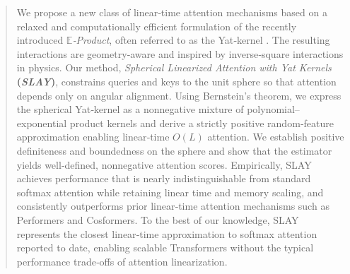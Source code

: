 \documentclass{article}
\begin{document}

\printAffiliationsAndNotice{}

\begin{abstract}
We propose a new class of linear‑time attention mechanisms based on a relaxed and computationally efficient formulation of the recently introduced \emph{$\mathbb{E}$‑Product}, often referred to as the Yat‑kernel \citep{Author2026Concurrent}. The resulting interactions are geometry‑aware and inspired by inverse‑square interactions in physics. 
Our method, \emph{Spherical Linearized Attention with Yat Kernels} \textbf{(\emph{SLAY})}, constrains queries and keys to the unit sphere so that attention depends only on angular alignment. Using Bernstein’s theorem, we express the spherical Yat‑kernel as a nonnegative mixture of polynomial–exponential product kernels and derive a strictly positive random‑feature approximation enabling linear‑time $O(L)$ attention. We establish positive definiteness and boundedness on the sphere and show that the estimator yields well‑defined, nonnegative attention scores.
Empirically, SLAY achieves performance that is nearly indistinguishable from standard softmax attention while retaining linear time and memory scaling, and consistently outperforms prior linear‑time attention mechanisms such as Performers and Cosformers. To the best of our knowledge, SLAY represents the closest linear‑time approximation to softmax attention reported to date, enabling scalable Transformers without the typical performance trade‑offs of attention linearization.
\end{abstract}

\end{document}
